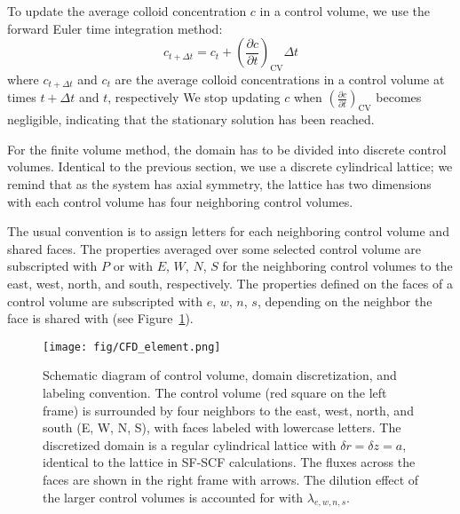 \documentclass[10pt, a4paper]{article}
\begin{document}
\begin{multicols}{2}
To update the average colloid concentration $c$ in a control volume, we use the forward Euler time integration method:
\begin{equation}
    c_{t + \Delta t} = c_t + \left( \frac{\partial c}{\partial t} \right)_{\textrm{CV}} \Delta t
\end{equation}
where $c_{t + \Delta t}$ and $c_t$ are the average colloid concentrations in a control volume at times $t + \Delta t$ and $t$, respectively
We stop updating $c$ when $\left( \frac{\partial c}{\partial t} \right)_{\textrm{CV}}$ becomes negligible, indicating that the stationary solution has been reached.

For the finite volume method, the domain has to be divided into discrete control volumes.
Identical to the previous section, we use a discrete cylindrical lattice; we remind that as the system has axial symmetry, the lattice has two dimensions with each control volume has four neighboring control volumes.

The usual convention is to assign letters for each neighboring control volume and shared faces.
The properties averaged over some selected control volume are subscripted with $P$ or with $E$, $W$, $N$, $S$ for the neighboring control volumes to the east, west, north, and south, respectively.
The properties defined on the faces of a control volume are subscripted with $e$, $w$, $n$, $s$, depending on the neighbor the face is shared with (see Figure~\ref{fig:CFD_element}).

\begin{figure}[H]
    \centering
    \texttt{[image: fig/CFD\_element.png]}
    \caption{
        Schematic diagram of control volume, domain discretization, and labeling convention.
        The control volume (red square on the left frame) is surrounded by four neighbors to the east, west, north, and south (E, W, N, S), with faces labeled with lowercase letters.
        The discretized domain is a regular cylindrical lattice with $\delta r = \delta z = a$, identical to the lattice in SF-SCF calculations.
        The fluxes across the faces are shown in the right frame with arrows.
        The dilution effect of the larger control volumes is accounted for with $\lambda_{e,w,n,s}$.
        }
    \label{fig:CFD_element}
\end{figure}


\end{multicols}
\end{document}
